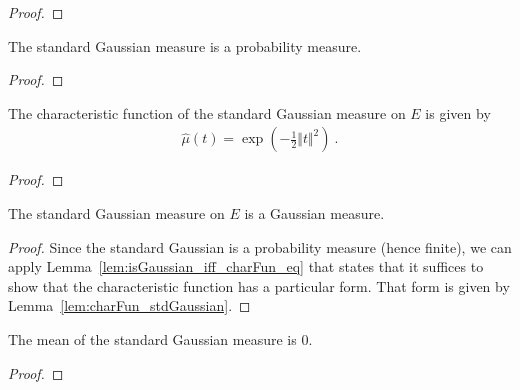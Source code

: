 \begin{proof}

\end{proof}


\begin{lemma}\label{lem:isProbabilityMeasure_stdGaussian}
  \leanok
The standard Gaussian measure is a probability measure.
\end{lemma}

\begin{proof}\leanok

\end{proof}


\begin{lemma}\label{lem:charFun_stdGaussian}
The characteristic function of the standard Gaussian measure on $E$ is given by
\begin{align*}
  \hat{\mu}(t) = \exp\left(-\frac{1}{2} \Vert t \Vert^2 \right) \: .
\end{align*}
\end{lemma}

\begin{proof}

\end{proof}


\begin{lemma}\label{lem:isGaussian_stdGaussian}
  \leanok
The standard Gaussian measure on $E$ is a Gaussian measure.
\end{lemma}

\begin{proof}
Since the standard Gaussian is a probability measure (hence finite), we can apply Lemma~\ref{lem:isGaussian_iff_charFun_eq} that states that it suffices to show that the characteristic function has a particular form.
That form is given by Lemma~\ref{lem:charFun_stdGaussian}.
\end{proof}


\begin{lemma}\label{lem:integral_id_stdGaussian}
The mean of the standard Gaussian measure is $0$.
\end{lemma}

\begin{proof}

\end{proof}


